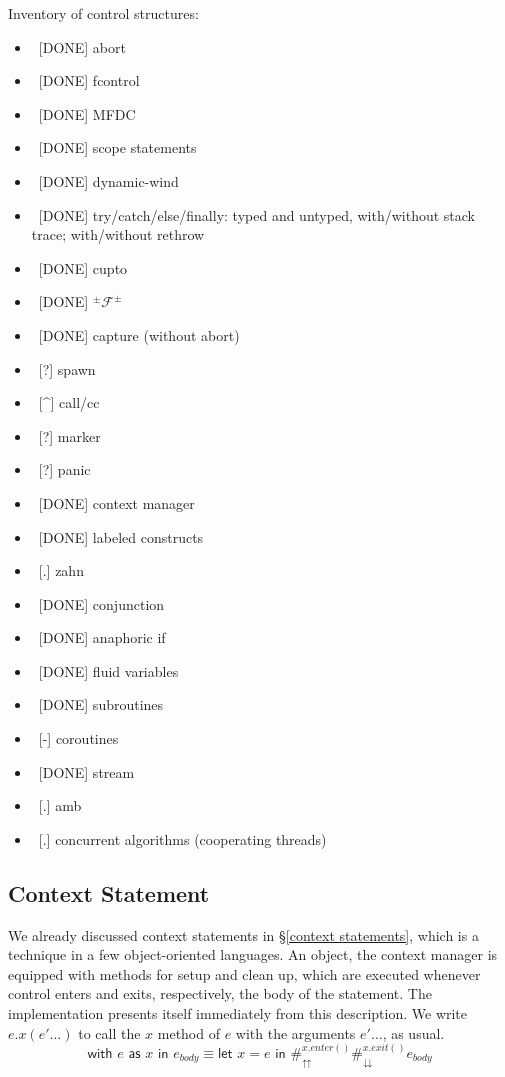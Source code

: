 \documentclass[11pt]{article}
\newcommand{\maybePage}{\newpage}
\newcommand{\letin}[2]{\textsf{let }#1\textsf{ in }#2}
\newcommand\F{\mathcal{F}}
\newcommand\pmFpm{^\pm\F^\pm}
\begin{document}
Inventory of control structures:
\begin{itemize}
\item\ [DONE] abort
\item\ [DONE] fcontrol
\item\ [DONE] MFDC
\item\ [DONE] scope statements
\item\ [DONE] dynamic-wind
\item\ [DONE] try/catch/else/finally: typed and untyped, with/without stack trace; with/without rethrow
\item\ [DONE] cupto
\item\ [DONE] $\pmFpm$
\item\ [DONE] capture (without abort)
%
\item\ [?] spawn
\item\ [\^{}] call/cc
\item\ [?] marker
\item\ [?] panic
%
\item\ [DONE] context manager
\item\ [DONE] labeled constructs
\item\ [.] zahn
\item\ [DONE] conjunction
\item\ [DONE] anaphoric if
\item\ [DONE] fluid variables
\item\ [DONE] subroutines
\item\ [-] coroutines
\item\ [DONE] stream
\item\ [.] amb
\item\ [.] concurrent algorithms (cooperating threads)
\end{itemize}


\maybePage
\subsection{Context Statement}

We already discussed context statements in \S\ref{context statements}, which is a technique in a few object-oriented languages.
An object, the context manager is equipped with methods for setup and clean up, which are executed whenever control enters and exits, respectively, the body of the statement.
The implementation presents itself immediately from this description.
We write $e.x(e'\ldots)$ to call the $x$ method of $e$ with the arguments $e'\ldots$, as usual.
$$\textsf{with }e\textsf{ as }x\textsf{ in }e_{body}
\equiv
	\letin{x = e}{\#_\upuparrows^{x.enter()}\#_\downdownarrows^{x.exit()}e_{body}}$$
\end{document}
